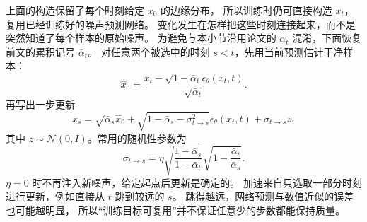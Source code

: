 上面的构造保留了每个时刻给定 $x_0$ 的边缘分布，
所以训练时仍可直接构造 $x_t$，复用已经训练好的噪声预测网络。
变化发生在怎样把这些时刻连接起来，而不是突然知道了每个样本的原始噪声。
为避免与本小节沿用论文的 $\alpha_t$ 混淆，下面恢复前文的累积记号 $\bar\alpha_t$。
对任意两个被选中的时刻 $s<t$，先用当前预测估计干净样本：
\[
\hat x_0=\frac{x_t-\sqrt{1-\bar\alpha_t}\epsilon_\theta(x_t,t)}
 {\sqrt{\bar\alpha_t}}.
\]
再写出一步更新
\[
x_s=\sqrt{\bar\alpha_s}\hat x_0+
 \sqrt{1-\bar\alpha_s-\sigma_{t\to s}^2}\epsilon_\theta(x_t,t)
 +\sigma_{t\to s}z,
\]
其中 $z\sim\mathcal N(0,I)$。常用的随机性参数为
\[
\sigma_{t\to s}=\eta\sqrt{\frac{1-\bar\alpha_s}{1-\bar\alpha_t}}
 \sqrt{1-\frac{\bar\alpha_t}{\bar\alpha_s}}.
\]
$\eta=0$ 时不再注入新噪声，给定起点后更新是确定的。
加速来自只选取一部分时刻进行更新，例如直接从 $t$ 跳到较远的 $s$。
跳得越远，网络预测与数值近似的误差也可能越明显，
所以“训练目标可复用”并不保证任意少的步数都能保持质量。\cite{ddim}
